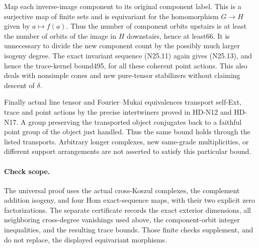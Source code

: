 Map each inverse-image component to its original component
label. This is a surjective map of finite sets and is equivariant
for the homomorphism $G\to H$ given by $a\mapsto f(a)$.
Thus the number of component orbits upstairs is at least
the number of orbits of the image in $H$ downstairs, hence
at least66. It is unnecessary to divide the new component
count by the possibly much larger isogeny degree. The exact
invariant sequence (N25.11) again gives (N25.13), and hence
the trace-kernel bound495, for all these coherent point actions.
This also deals with nonsimple cones and new pure-tensor
stabilizers without claiming descent of $\delta$.

Finally actual line tensor and Fourier--Mukai equivalences
transport self-Ext, trace and point actions by the precise
intertwiners proved in HD-N12 and HD-N17. A group preserving
the transported object conjugates back to a faithful point
group of the object just handled. Thus the same bound holds
through the listed transports. Arbitrary longer complexes,
new same-grade multiplicities, or different support arrangements
are not asserted to satisfy this particular bound.

\paragraph{Check scope.}
The universal proof uses the actual cross-Koszul complexes,
the complement addition isogeny, and four Hom exact-sequence
maps, with their two explicit zero factorizations. The separate
certificate  records
the exact exterior dimensions, all neighboring cross-degree
vanishings used above, the component-orbit integer inequalities,
and the resulting trace bounds. Those finite checks supplement,
and do not replace, the displayed equivariant morphisms.
